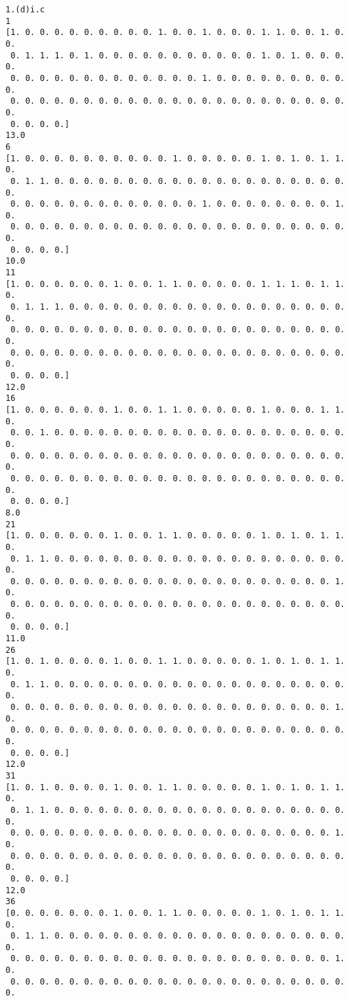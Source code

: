 \documentclass[11pt]{article}
\begin{document}
    \begin{Verbatim}[commandchars=\\\{\}]
1.(d)i.c
1
[1. 0. 0. 0. 0. 0. 0. 0. 0. 0. 1. 0. 0. 1. 0. 0. 0. 1. 1. 0. 0. 1. 0. 0.
 0. 1. 1. 1. 0. 1. 0. 0. 0. 0. 0. 0. 0. 0. 0. 0. 0. 1. 0. 1. 0. 0. 0. 0.
 0. 0. 0. 0. 0. 0. 0. 0. 0. 0. 0. 0. 0. 1. 0. 0. 0. 0. 0. 0. 0. 0. 0. 0.
 0. 0. 0. 0. 0. 0. 0. 0. 0. 0. 0. 0. 0. 0. 0. 0. 0. 0. 0. 0. 0. 0. 0. 0.
 0. 0. 0. 0.]
13.0
6
[1. 0. 0. 0. 0. 0. 0. 0. 0. 0. 0. 1. 0. 0. 0. 0. 0. 1. 0. 1. 0. 1. 1. 0.
 0. 1. 1. 0. 0. 0. 0. 0. 0. 0. 0. 0. 0. 0. 0. 0. 0. 0. 0. 0. 0. 0. 0. 0.
 0. 0. 0. 0. 0. 0. 0. 0. 0. 0. 0. 0. 0. 1. 0. 0. 0. 0. 0. 0. 0. 0. 1. 0.
 0. 0. 0. 0. 0. 0. 0. 0. 0. 0. 0. 0. 0. 0. 0. 0. 0. 0. 0. 0. 0. 0. 0. 0.
 0. 0. 0. 0.]
10.0
11
[1. 0. 0. 0. 0. 0. 0. 1. 0. 0. 1. 1. 0. 0. 0. 0. 0. 1. 1. 1. 0. 1. 1. 0.
 0. 1. 1. 1. 0. 0. 0. 0. 0. 0. 0. 0. 0. 0. 0. 0. 0. 0. 0. 0. 0. 0. 0. 0.
 0. 0. 0. 0. 0. 0. 0. 0. 0. 0. 0. 0. 0. 0. 0. 0. 0. 0. 0. 0. 0. 0. 0. 0.
 0. 0. 0. 0. 0. 0. 0. 0. 0. 0. 0. 0. 0. 0. 0. 0. 0. 0. 0. 0. 0. 0. 0. 0.
 0. 0. 0. 0.]
12.0
16
[1. 0. 0. 0. 0. 0. 0. 1. 0. 0. 1. 1. 0. 0. 0. 0. 0. 1. 0. 0. 0. 1. 1. 0.
 0. 0. 1. 0. 0. 0. 0. 0. 0. 0. 0. 0. 0. 0. 0. 0. 0. 0. 0. 0. 0. 0. 0. 0.
 0. 0. 0. 0. 0. 0. 0. 0. 0. 0. 0. 0. 0. 0. 0. 0. 0. 0. 0. 0. 0. 0. 0. 0.
 0. 0. 0. 0. 0. 0. 0. 0. 0. 0. 0. 0. 0. 0. 0. 0. 0. 0. 0. 0. 0. 0. 0. 0.
 0. 0. 0. 0.]
8.0
21
[1. 0. 0. 0. 0. 0. 0. 1. 0. 0. 1. 1. 0. 0. 0. 0. 0. 1. 0. 1. 0. 1. 1. 0.
 0. 1. 1. 0. 0. 0. 0. 0. 0. 0. 0. 0. 0. 0. 0. 0. 0. 0. 0. 0. 0. 0. 0. 0.
 0. 0. 0. 0. 0. 0. 0. 0. 0. 0. 0. 0. 0. 0. 0. 0. 0. 0. 0. 0. 0. 0. 1. 0.
 0. 0. 0. 0. 0. 0. 0. 0. 0. 0. 0. 0. 0. 0. 0. 0. 0. 0. 0. 0. 0. 0. 0. 0.
 0. 0. 0. 0.]
11.0
26
[1. 0. 1. 0. 0. 0. 0. 1. 0. 0. 1. 1. 0. 0. 0. 0. 0. 1. 0. 1. 0. 1. 1. 0.
 0. 1. 1. 0. 0. 0. 0. 0. 0. 0. 0. 0. 0. 0. 0. 0. 0. 0. 0. 0. 0. 0. 0. 0.
 0. 0. 0. 0. 0. 0. 0. 0. 0. 0. 0. 0. 0. 0. 0. 0. 0. 0. 0. 0. 0. 0. 1. 0.
 0. 0. 0. 0. 0. 0. 0. 0. 0. 0. 0. 0. 0. 0. 0. 0. 0. 0. 0. 0. 0. 0. 0. 0.
 0. 0. 0. 0.]
12.0
31
[1. 0. 1. 0. 0. 0. 0. 1. 0. 0. 1. 1. 0. 0. 0. 0. 0. 1. 0. 1. 0. 1. 1. 0.
 0. 1. 1. 0. 0. 0. 0. 0. 0. 0. 0. 0. 0. 0. 0. 0. 0. 0. 0. 0. 0. 0. 0. 0.
 0. 0. 0. 0. 0. 0. 0. 0. 0. 0. 0. 0. 0. 0. 0. 0. 0. 0. 0. 0. 0. 0. 1. 0.
 0. 0. 0. 0. 0. 0. 0. 0. 0. 0. 0. 0. 0. 0. 0. 0. 0. 0. 0. 0. 0. 0. 0. 0.
 0. 0. 0. 0.]
12.0
36
[0. 0. 0. 0. 0. 0. 0. 1. 0. 0. 1. 1. 0. 0. 0. 0. 0. 1. 0. 1. 0. 1. 1. 0.
 0. 1. 1. 0. 0. 0. 0. 0. 0. 0. 0. 0. 0. 0. 0. 0. 0. 0. 0. 0. 0. 0. 0. 0.
 0. 0. 0. 0. 0. 0. 0. 0. 0. 0. 0. 0. 0. 0. 0. 0. 0. 0. 0. 0. 0. 0. 1. 0.
 0. 0. 0. 0. 0. 0. 0. 0. 0. 0. 0. 0. 0. 0. 0. 0. 0. 0. 0. 0. 0. 0. 0. 0.

\end{Verbatim}
\end{document}
